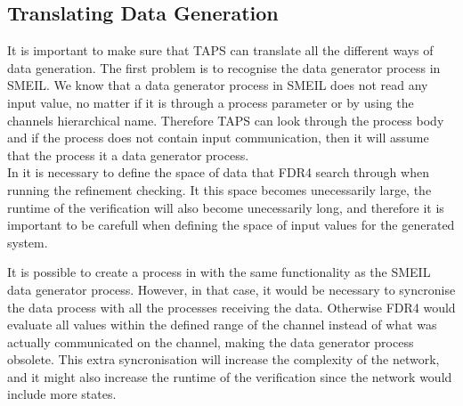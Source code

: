 \subsection{Translating Data Generation}
It is important to make sure that TAPS can translate all the different ways of data generation. The first problem is to recognise the data generator process in SMEIL. We know that a data generator process in SMEIL does not read any input value, no matter if it is through a process parameter or by using the channels hierarchical name. Therefore TAPS can look through the process body and if the process does not contain input communication, then it will assume that the process it a data generator process. \\

In \cspm it is necessary to define the space of data that FDR4 search through when running the refinement checking. It this space becomes unecessarily large, the runtime of the verification will also become unecessarily long, and therefore it is important to be carefull when defining the space of input values for the generated system.

It is possible to create a process in \cspm with the same functionality as the SMEIL data generator process. However, in that case, it would be necessary to syncronise the data process with all the processes receiving the data. Otherwise FDR4 would evaluate all values within the defined range of the channel instead of what was actually communicated on the channel, making the data generator process obsolete. This extra syncronisation will increase the complexity of the \cspm{} network, and it might also increase the runtime of the verification since the \cspm{} network would include more states.

